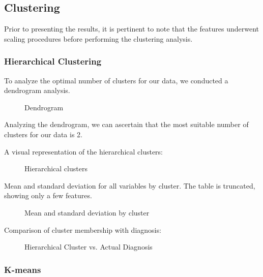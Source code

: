 \documentclass[conference]{IEEEtran}
\begin{document}
\subsection{Clustering}

Prior to presenting the results, it is pertinent to note that the features underwent scaling procedures before performing the clustering analysis.

\subsubsection{Hierarchical Clustering}
To analyze the optimal number of clusters for our data, we conducted a dendrogram analysis.
\vspace{0.5cm}
\begin{figure}[H]
      \centering
       {}
      \caption{Dendrogram}
\end{figure}

Analyzing the dendrogram, we can ascertain that the most suitable number of clusters for our data is 2.

\vspace{0.5cm}

A visual representation of the hierarchical clusters:

\begin{figure}[H]
      \centering
       {}
      \caption{Hierarchical clusters}
\end{figure}


Mean and standard deviation for all variables by cluster.
The table is truncated, showing only a few features.

\begin{figure}[H]
      \centering
       {}
      \caption{Mean and standard deviation by cluster}
\end{figure}

Comparison of cluster membership with diagnosis:
\begin{figure}[H]
      \centering
       {}
      \caption{Hierarchical Cluster vs. Actual Diagnosis}
\end{figure}


\subsubsection{K-means}
\end{document}
